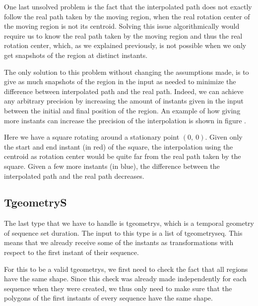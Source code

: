 One last unsolved problem is the fact that the interpolated path does not exactly follow the real path taken by the moving region, when the real rotation center of the moving region is not its centroid. Solving this issue algorithmically would require us to know the real path taken by the moving region and thus the real rotation center, which, as we explained previously, is not possible when we only get snapshots of the region at distinct instants. 

The only solution to this problem without changing the assumptions made, is to give as much snapshots of the region in the input as needed to minimize the difference between interpolated path and the real path. Indeed, we can achieve any arbitrary precision by increasing the amount of instants given in the input between the initial and final position of the region. An example of how giving more instants can increase the precision of the interpolation is shown in figure . \\


Here we have a square rotating around a stationary point $(0,\ 0)$. Given only the start and end instant (in red) of the square, the interpolation using the centroid as rotation center would be quite far from the real path taken by the square. Given a few more instants (in blue), the difference between the interpolated path and the real path decreases.

\subsection{TgeometryS}
\label{section:internal_repr_s}

The last type that we have to handle is tgeometrys, which is a temporal geometry of sequence set duration. The input to this type is a list of tgeometryseq. This means that we already receive some of the instants as transformations with respect to the first instant of their sequence.

For this to be a valid tgeometrys, we first need to check the fact that all regions have the same shape. Since this check was already made independently for each sequence when they were created, we thus only need to make sure that the polygons of the first instants of every sequence have the same shape. \\

